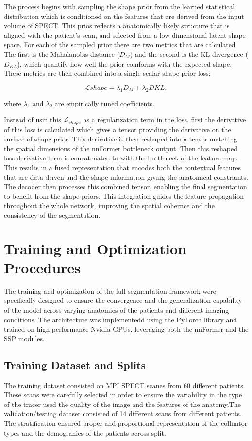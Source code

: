 The process begins with sampling the shape prior from the learned statistical distribution which is conditioned on the features that are derived from the input volume of SPECT. This prios reflects a anatomically likely structure that is aligned with the patient's scan, and selected from a low-dimensional latent shape space. For each of the sampled prior there are two metrics that are calculated The first is the Mahalanobis distance ($D_M$) and the second is the KL divergence ($D_{KL}$), which quantify how well the prior comforms with the expected shape. These metrics are then combined into a single scalar shape prior loss:

\begin{equation} \mathcal{L}{shape} = \lambda_1 D_M + \lambda_2 D{KL}, \end{equation}

where $\lambda_1$ and $\lambda_2$ are empirically tuned coefficients.

Instead of usin this $\mathcal{L}_{shape}$ as a regularization term in the loss, first the derivative of this loss is calculated which gives a tensor providing the derivative on the surface of shape prior. This derivative is then reshaped into a tensor matching the spatial dimensions of the nnFormer bottleneck output. Then this reshaped loss derivative term is concatenated to with the bottleneck of the feature map. This results in a fused representation that encodes both the contextual features that are data driven and the shape information giving the anatomical constraints. The decoder then processes this combined tensor, enabling the final segmentation to benefit from the shape priors. This integration guides the feature propagation throughout the whole network, improving the spatial cohernce and the consistency of the segmentation.


\section{Training and Optimization Procedures}
The training and optimization of the full segmentation framework were specifically designed to ensure the convergence and the generalization capability of the model across varying anatomies of the patients and different imaging conditions. The architecture was implementedd using the PyTorch library and trained on high-performance Nvidia GPUs, leveraging both the nnFormer and the SSP modules.

\subsection{Training Dataset and Splits}
The training dataset consisted on MPI SPECT scanes from 60 different patients These scans were carefully selected in order to ensure the variability in the type of the tracer used the quality of the image and the features of the anatomy.The validation/testing dataset consisted of 14 different scans from different patients. The stratification ensured proper and proportional representation of the collimtor types and the demograhics of the patients across split.

